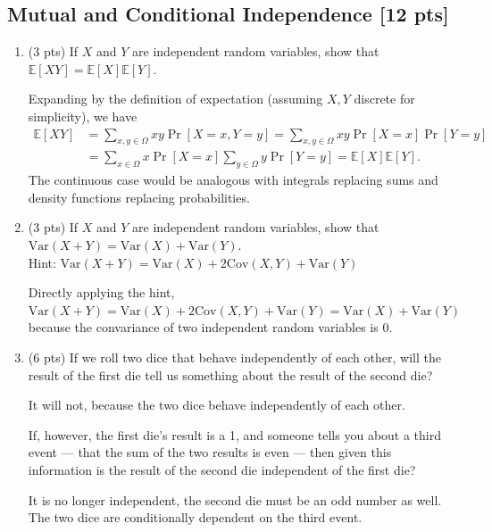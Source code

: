 \documentclass[a4paper]{article}
\theoremstyle{definition}
\newcommand{\Var}{\mathrm{Var}}
\newcommand{\Cov}{\mathrm{Cov}}
\def\E{\mathbb E}
\newenvironment{soln}{
	\leavevmode\color{blue}\ignorespaces
}{}
\begin{document}
	\subsection{Mutual and Conditional Independence [12 pts]}
	\begin{enumerate}
		\item (3 pts) If $X$ and $Y$ are independent random variables, show that
		$\mathbb{E}[XY] = \mathbb{E}[X]\mathbb{E}[Y]$.
		
		\begin{soln}  Expanding by the definition of expectation (assuming $ X,Y $ discrete for simplicity), we have  \begin{align*}
				\E[XY] &= \sum_{x,y\in\Omega} xy \Pr[X=x,Y=y] = \sum_{x,y\in\Omega} xy \Pr[X=x]\Pr[Y=y]\\ &=
				\sum_{x\in\Omega} x \Pr[X=x]\sum_{y\in\Omega} y \Pr[Y=y] = \E[X]\E[Y].
		\end{align*} The continuous case would be analogous with integrals replacing sums and density functions replacing probabilities. \end{soln}
		
		\item (3 pts) If $X$ and $Y$ are independent random variables, show that
		$\Var(X+Y) = \Var(X) + \Var(Y)$. \\
		Hint: $\Var(X+Y) = \Var(X) + 2\Cov(X, Y) + \Var(Y)$
		
		\begin{soln}  Directly applying the hint, $ \Var(X+Y) = \Var(X) + 2\Cov(X, Y) + \Var(Y) = \Var(X) + \Var(Y) $ because the convariance of two independent random variables is $ 0 $. \end{soln}
		
		\item (6 pts) If we roll two dice that behave independently of each
		other, will the result of the first die tell us something about the
		result of the second die? 
		
		\begin{soln}  It will not, because the two dice behave independently of each other. \end{soln}
		
		If, however, the first die's result is a 1,
		and someone tells you about a third event --- that the sum of the two
		results is even --- then given this information is the result of the second die
		independent of the first die? 
		
		\begin{soln}  It is no longer independent, the second die must be an odd number as well. The two dice are conditionally dependent on the third event. \end{soln}
	\end{enumerate}
	
\end{document}
